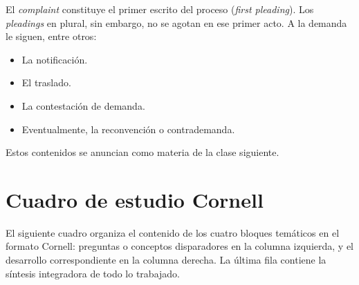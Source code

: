 \documentclass[12pt,oneside]{book}
\begin{document}
El \textit{complaint} constituye el primer escrito del proceso (\textit{first pleading}). Los \textit{pleadings} en plural, sin embargo, no se agotan en ese primer acto. A la demanda le siguen, entre otros:

\begin{itemize}
    \item La notificación.
    \item El traslado.
    \item La contestación de demanda.
    \item Eventualmente, la reconvención o contrademanda.
\end{itemize}

Estos contenidos se anuncian como materia de la clase siguiente.

\chapter{Cuadro de estudio Cornell}

El siguiente cuadro organiza el contenido de los cuatro bloques temáticos en el formato Cornell: preguntas o conceptos disparadores en la columna izquierda, y el desarrollo correspondiente en la columna derecha. La última fila contiene la síntesis integradora de todo lo trabajado.
\end{document}

